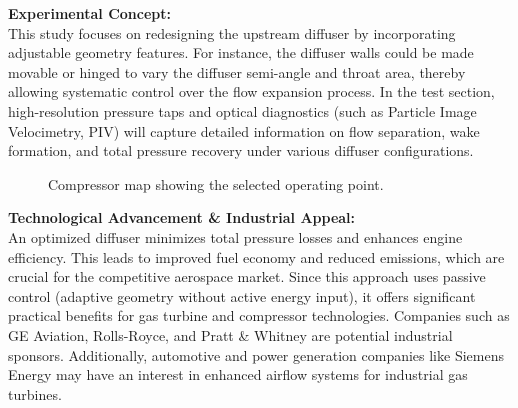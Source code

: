 \documentclass[12pt,a4paper]{article}
\begin{document}
\textbf{Experimental Concept:}\\[0.5em]
This study focuses on redesigning the upstream diffuser by incorporating adjustable geometry features. For instance, the diffuser walls could be made movable or hinged to vary the diffuser semi-angle and throat area, thereby allowing systematic control over the flow expansion process. In the test section, high-resolution pressure taps and optical diagnostics (such as Particle Image Velocimetry, PIV) will capture detailed information on flow separation, wake formation, and total pressure recovery under various diffuser configurations.

\vspace{0.5em}
\begin{figure}[h!]
  \centering
  \caption{Compressor map showing the selected operating point.}
  \label{fig:compressor_map}
\end{figure}

\vspace{0.5em}
\textbf{Technological Advancement \& Industrial Appeal:}\\[0.5em]
An optimized diffuser minimizes total pressure losses and enhances engine efficiency. This leads to improved fuel economy and reduced emissions, which are crucial for the competitive aerospace market. Since this approach uses passive control (adaptive geometry without active energy input), it offers significant practical benefits for gas turbine and compressor technologies. Companies such as GE Aviation, Rolls-Royce, and Pratt \& Whitney are potential industrial sponsors. Additionally, automotive and power generation companies like Siemens Energy may have an interest in enhanced airflow systems for industrial gas turbines.


\vspace{0.5em}
\end{document}
